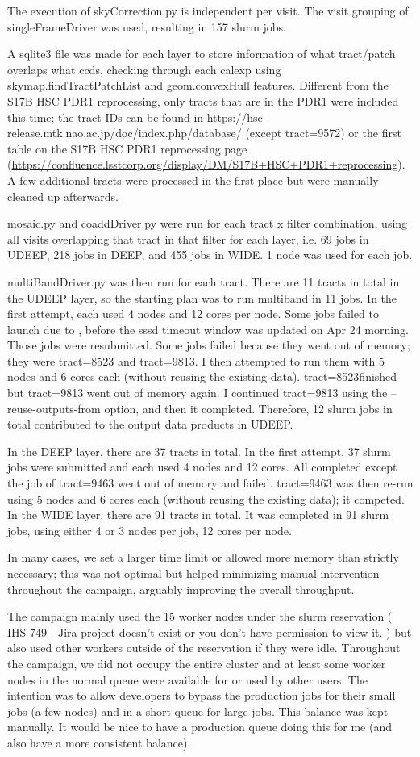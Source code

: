 The execution of skyCorrection.py is independent per visit. The visit grouping of singleFrameDriver was used, resulting in 157 slurm jobs.

A sqlite3 file was made for each layer to store information of what tract/patch overlaps what ccds, checking through each calexp using skymap.findTractPatchList  and geom.convexHull features. Different from the S17B HSC PDR1 reprocessing, only tracts that are in the PDR1 were included this time; the tract IDs can be found in https://hsc-release.mtk.nao.ac.jp/doc/index.php/database/ (except tract=9572) or the first table on the S17B HSC PDR1 reprocessing page (\url{https://confluence.lsstcorp.org/display/DM/S17B+HSC+PDR1+reprocessing}).  A few additional tracts were processed in the first place but were manually cleaned up afterwards.

mosaic.py and coaddDriver.py were run for each tract x filter combination, using all visits overlapping that tract in that filter for each layer, i.e. 69 jobs in UDEEP, 218 jobs in DEEP, and 455 jobs in WIDE. 1 node was used for each job.

multiBandDriver.py was then run for each tract.  There are 11 tracts in total in the UDEEP layer, so the starting plan was to run multiband in 11 jobs. In the first attempt, each used 4 nodes and 12 cores per node. Some jobs failed to launch due to , before the sssd timeout window was updated on Apr 24 morning. Those jobs were resubmitted.   Some jobs failed because they went out of memory; they were tract=8523 and tract=9813. I then attempted to run them with 5 nodes and 6 cores each (without reusing the existing data).  tract=8523finished but tract=9813 went out of memory again. I continued  tract=9813 using the --reuse-outputs-from option, and then it completed. Therefore, 12 slurm jobs in total contributed to the output data products in UDEEP.

In the DEEP layer, there are 37 tracts in total. In the first attempt, 37 slurm jobs were submitted and each used 4 nodes and 12 cores. All completed except the job of tract=9463 went out of memory and failed. tract=9463 was then re-run using 5 nodes and 6 cores each (without reusing the existing data); it competed.  In the WIDE layer, there are 91 tracts in total. It was completed in 91 slurm jobs, using either 4 or 3 nodes per job, 12 cores per node.

In many cases, we set a larger time limit or allowed more memory than strictly necessary; this was not optimal but helped minimizing manual intervention throughout the campaign, arguably improving the overall throughput.

The campaign mainly used the 15 worker nodes under the slurm reservation ( IHS-749 - Jira project doesn't exist or you don't have permission to view it. ) but also used other workers outside of the reservation if they were idle.  Throughout the campaign, we did not occupy the entire cluster and at least some worker nodes in the normal queue were available for or used by other users. The intention was to allow developers to bypass the production jobs for their small jobs (a few nodes) and in a short queue for large jobs. This balance was kept manually.  It would be nice to have a production queue doing this for me (and also have a more consistent balance).

